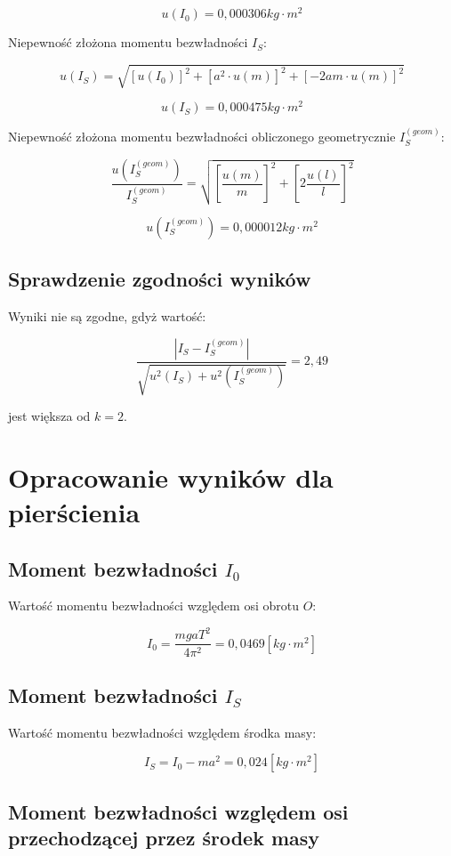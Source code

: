 \documentclass[a4paper,10pt,twoside]{article}
\begin{document}
$$ u(I_0) = 0,000306 \unit{kg \cdot m^2} $$

Niepewność złożona momentu bezwładności $I_S$:

$$ u(I_S) = \sqrt{ \left[ u(I_0) \right]^2 + \left[ a^2 \cdot u(m) \right]^2 + \left[-2 a m \cdot u(m) \right]^2 } $$

$$ u(I_S) = 0,000475 \unit{kg \cdot m^2} $$

Niepewność złożona momentu bezwładności obliczonego geometrycznie $I_S^{(geom)}$:

$$ \frac{u(I_S^{(geom)})}{I_S^{(geom)}} = \sqrt{\left[ \frac{u(m)}{m} \right]^2 + \left[ 2\frac{u(l)}{l} \right]^2 } $$

$$ u(I_S^{(geom)}) = 0,000012 \unit{kg \cdot m^2} $$


\subsection{Sprawdzenie zgodności wyników}
Wyniki nie są zgodne, gdyż wartość:

$$ \frac{ \left| I_S - I_S^{(geom)} \right| }{\sqrt{u^2(I_S) + u^2(I_S^{(geom)})}} = 2,49 $$

jest większa od $k = 2$.

\section{Opracowanie wyników dla pierścienia}

\subsection{Moment bezwładności $I_0$}

Wartość momentu bezwładności względem osi obrotu $O$:

$$ I_0 = \frac{mgaT^2}{4\pi^2} = 0,0469 \unit{[kg \cdot m^2]} $$

\subsection{Moment bezwładności $I_S$}

Wartość momentu bezwładności względem środka masy:

$$ I_S = I_0 - ma^2 = 0,024 \unit{[kg \cdot m^2]} $$

\subsection{Moment bezwładności względem osi przechodzącej przez środek masy}
\end{document}
